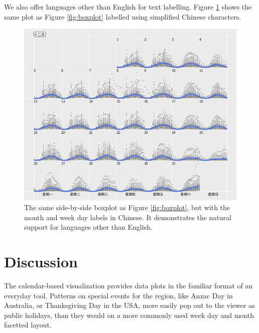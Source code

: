 \documentclass[article]{jss}
\theoremstyle{definition}
\theoremstyle{definition}
\theoremstyle{remark}
\begin{document}
We also offer languages other than English for text labelling. Figure
\ref{fig:chn} shows the same plot as Figure \ref{fig:boxplot} labelled
using simplified Chinese characters.

\begin{CodeChunk}
\begin{figure}

{\centering \includegraphics[width=\textwidth]{figure/chn-1} 

}

\caption[The same side-by-side boxplot as Figure \ref{fig:boxplot},
but with the month and week day labels in Chinese. It demonstrates the
natural support for languages other than English.]{The same side-by-side boxplot as Figure \ref{fig:boxplot},
but with the month and week day labels in Chinese. It demonstrates the
natural support for languages other than English.}\label{fig:chn}
\end{figure}
\end{CodeChunk}





\section{Discussion}\label{discussion}

\label{sec:discussion}

The calendar-based visualization provides data plots in the familiar
format of an everyday tool. Patterns on special events for the region,
like Anzac Day in Australia, or Thanksgiving Day in the USA, more easily
pop out to the viewer as public holidays, than they would on a more
commonly used week day and month facetted layout.
\end{document}
